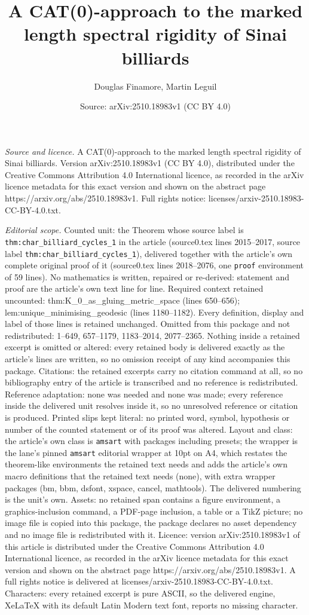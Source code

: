 \documentclass[10pt,a4paper]{amsart}
\title[A CAT(0)-approach to the marked length spectral rigidity of ]{A CAT(0)-approach to the marked length spectral rigidity of Sinai billiards}
\author{Douglas Finamore, Martin Leguil}
\date{Source: arXiv:2510.18983v1 (CC BY 4.0)}
\begin{document}
\maketitle

\noindent\emph{Source and licence.} A CAT(0)-approach to the marked length spectral rigidity of Sinai billiards. Version arXiv:2510.18983v1 (CC BY 4.0), distributed under the Creative Commons Attribution 4.0 International licence, as recorded in the arXiv licence metadata for this exact version and shown on the abstract page https://arxiv.org/abs/2510.18983v1. Full rights notice: licenses/arxiv-2510.18983-CC-BY-4.0.txt.\par\smallskip

\noindent\textit{Editorial scope.} Counted unit: the Theorem whose source label is \texttt{thm:char\_billiard\_cycles\_1} in the article (source0.tex lines 2015--2017, source label \texttt{thm:char\_billiard\_cycles\_1}), delivered together with the article's own complete original proof of it (source0.tex lines 2018--2076, one \texttt{proof} environment of 59 lines). No mathematics is written, repaired or re-derived: statement and proof are the article's own text line for line. Required context retained uncounted: thm:K\_0\_as\_gluing\_metric\_space (lines 650--656); lem:unique\_minimising\_geodesic (lines 1180--1182). Every definition, display and label of those lines is retained unchanged. Omitted from this package and not redistributed: 1--649, 657--1179, 1183--2014, 2077--2365. Nothing inside a retained excerpt is omitted or altered: every retained body is delivered exactly as the article's lines are written, so no omission receipt of any kind accompanies this package. Citations: the retained excerpts carry no citation command at all, so no bibliography entry of the article is transcribed and no reference is redistributed. Reference adaptation: none was needed and none was made; every reference inside the delivered unit resolves inside it, so no unresolved reference or citation is produced. Printed slips kept literal: no printed word, symbol, hypothesis or number of the counted statement or of its proof was altered. Layout and class: the article's own class is \texttt{amsart} with packages including presets; the wrapper is the lane's pinned \texttt{amsart} editorial wrapper at 10pt on A4, which restates the theorem-like environments the retained text needs and adds the article's own macro definitions that the retained text needs (none), with extra wrapper packages (bm, bbm, dsfont, xspace, cancel, mathtools). The delivered numbering is the unit's own. Assets: no retained span contains a figure environment, a graphics-inclusion command, a PDF-page inclusion, a table or a TikZ picture; no image file is copied into this package, the package declares no asset dependency and no image file is redistributed with it. Licence: version arXiv:2510.18983v1 of this article is distributed under the Creative Commons Attribution 4.0 International licence, as recorded in the arXiv licence metadata for this exact version and shown on the abstract page https://arxiv.org/abs/2510.18983v1. A full rights notice is delivered at licenses/arxiv-2510.18983-CC-BY-4.0.txt. Characters: every retained excerpt is pure ASCII, so the delivered engine, XeLaTeX with its default Latin Modern text font, reports no missing character.
\end{document}
